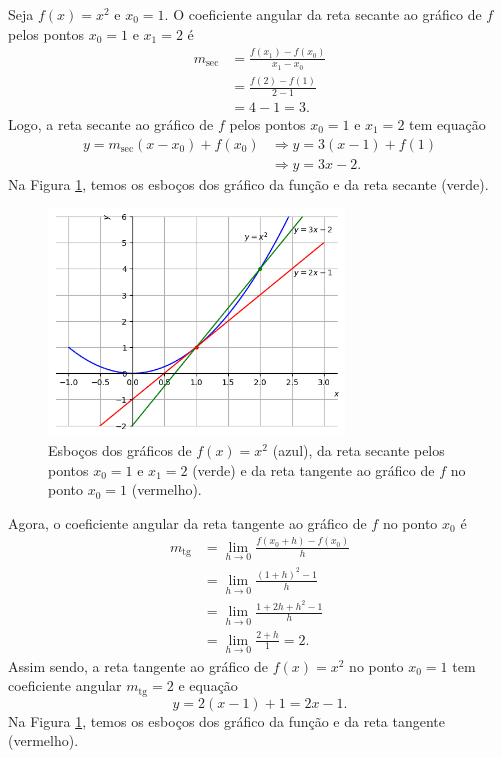\begin{ex}
  Seja $f(x)=x^2$ e $x_0 = 1$. O coeficiente angular da reta secante ao gráfico de $f$ pelos pontos $x_0=1$ e $x_1 = 2$ é
  \begin{align}
    m_{\text{sec}} &= \frac{f(x_1)-f(x_0)}{x_1-x_0}\\
                   &= \frac{f(2) - f(1)}{2-1}\\
                   &= 4-1 = 3.
  \end{align}
  Logo, a reta secante ao gráfico de $f$ pelos pontos $x_0=1$ e $x_1=2$ tem equação
  \begin{align}
    y = m_{\text{sec}}(x-x_0) + f(x_0) &\Rightarrow y = 3(x-1)+f(1)\\
                                       &\Rightarrow y = 3x - 2.
  \end{align}
  Na Figura \ref{fig:cap_deriv_ex_rt_x2}, temos os esboços dos gráfico da função e da reta secante (verde).
  
  \begin{figure}[H]
    \centering
    \includegraphics[width=0.7\textwidth]{./cap_deriv/dados/fig_cap_deriv_ex_rt_x2/fig_cap_deriv_ex_rt_x2}
    \caption{Esboços dos gráficos de $f(x)=x^2$ (azul), da reta secante pelos pontos $x_0=1$ e $x_1=2$ (verde) e da reta tangente ao gráfico de $f$ no ponto $x_0 = 1$ (vermelho).}
    \label{fig:cap_deriv_ex_rt_x2}
  \end{figure}

  Agora, o coeficiente angular da reta tangente ao gráfico de $f$ no ponto $x_0$ é
  \begin{align}
    m_{\text{tg}} &= \lim_{h\to 0} \frac{f(x_0+h)-f(x_0)}{h}\\
                  &= \lim_{h\to 0} \frac{(1+h)^2-1}{h}\\
                  &= \lim_{h\to 0} \frac{1+2h+h^2-1}{h}\\
                  &= \lim_{h\to 0} \frac{2+h}{1} = 2.
  \end{align}
  Assim sendo, a reta tangente ao gráfico de $f(x)=x^2$ no ponto $x_0=1$ tem coeficiente angular $m_{\text{tg}} = 2$ e equação
  \begin{equation}
    y = 2(x-1)+1 = 2x-1.
  \end{equation}
  Na Figura \ref{fig:cap_deriv_ex_rt_x2}, temos os esboços dos gráfico da função e da reta tangente (vermelho).
  

\end{ex}
